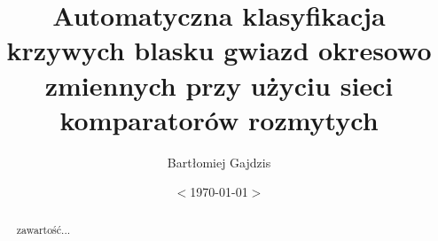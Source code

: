 \documentclass[magisterska]{pracalicmgr}
\author{Bartłomiej Gajdzis}
\title{Automatyczna klasyfikacja krzywych blasku gwiazd okresowo zmiennych przy użyciu sieci komparatorów rozmytych}
\date{$<$\today$>$}
\begin{document}
    
    
    \maketitle
    \let\cleardoublepage\clearpage
    
    \begin{abstract}
        zawartość...
    \end{abstract}
    
\end{document}

